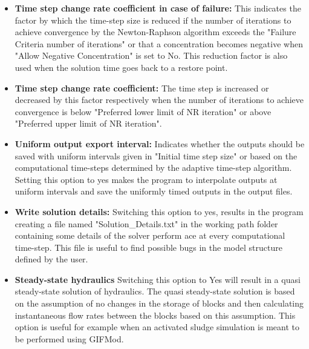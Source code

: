 \begin{itemize}
\item \textbf{Time step change rate coefficient in case of failure: } This indicates the factor by which the time-step size is reduced if the number of iterations to achieve convergence by the Newton-Raphson algorithm exceeds the "Failure Criteria number of iterations" or that a concentration becomes negative when "Allow Negative Concentration" is set to No. This reduction factor is also used when the solution time goes back to a restore point. 
\item \textbf{Time step change rate coefficient: } The time step is increased or decreased by this factor respectively when the number of iterations to achieve convergence is below "Preferred lower limit of NR iteration" or above "Preferred upper limit of NR iteration". 
\item \textbf{Uniform output export interval: } Indicates whether the outputs should be saved with uniform intervals given in "Initial time step size" or based on the computational time-steps determined by the adaptive time-step algorithm. Setting this option to yes makes the program to interpolate outputs at uniform intervals and save the uniformly timed outputs in the output files. 
\item \textbf{Write solution details: } Switching this option to yes, results in the program creating a file named "Solution\_Details.txt" in the working path folder containing some details of the solver perform ace at every computational time-step. This file is useful to find possible bugs in the model structure defined by the user. 
\item \textbf{Steady-state hydraulics} Switching this option to Yes will result in a quasi steady-state solution of hydraulics. The quasi steady-state solution is based on the assumption of no changes in the storage of blocks and then calculating instantaneous flow rates between the blocks based on this assumption. This option is useful for example when an activated sludge simulation is meant to be performed using GIFMod. 
\end{itemize}
